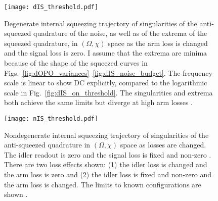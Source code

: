 \begin{figure}
    \centering
    \texttt{[image: dIS\_threshold.pdf]}
    \caption{  Degenerate internal squeezing trajectory of singularities of the anti-squeezed quadrature of the noise, as well as of the extrema of the squeezed quadrature, in $(\Omega, \chi)$ space as the arm loss is changed and the signal loss is zero. I assume that the extrema are minima because of the shape of the squeezed curves in Figs.~\ref{fig:dOPO_variances}~\ref{fig:dIS_noise_budget}.  The frequency scale is linear to show DC explicitly, compared to the logarithmic scale in Fig.~\ref{fig:dIS_on_threshold}. The singularities and extrema both achieve the same limits but diverge at high arm losses . }
    \label{fig:dIS_threshold_traj} %
\end{figure}
\begin{figure}
    \centering
    \texttt{[image: nIS\_threshold.pdf]}
    \caption{  Nondegenerate internal squeezing trajectory of singularities of the anti-squeezed quadrature in $(\Omega, \chi)$ space as losses are changed. The idler readout is zero and the signal loss is fixed and non-zero . There are two loss effects shown: (1) the idler loss is changed and the arm loss is zero and (2) the idler loss is fixed and non-zero and the arm loss is changed. The limits to known configurations are shown . }
    \label{fig:nIS_threshold_traj}
\end{figure}

